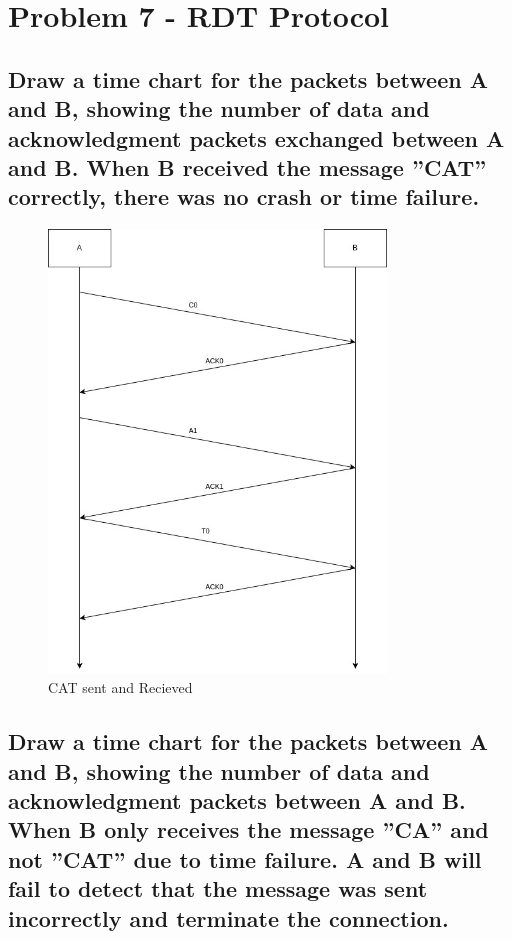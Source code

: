 \documentclass{article}
\begin{document}
\section{Problem 7 - RDT Protocol}

\subsection{Draw a time chart for the packets between A and B, showing the number of
data and acknowledgment packets exchanged between A and B. When B received the
message ”CAT” correctly, there was no crash or time failure.}

\begin{figure}[H]
	\centering
	\includegraphics[width=0.8\textwidth]{question7/7a.jpg}
	\caption{CAT sent and Recieved}
	\label{fig:7a}
\end{figure}


\subsection{Draw a time chart for the packets between A and B, showing the number of
data and acknowledgment packets between A and B. When B only receives the message
”CA” and not ”CAT” due to time failure. A and B will fail to detect that the message
was sent incorrectly and terminate the connection.}
\end{document}
